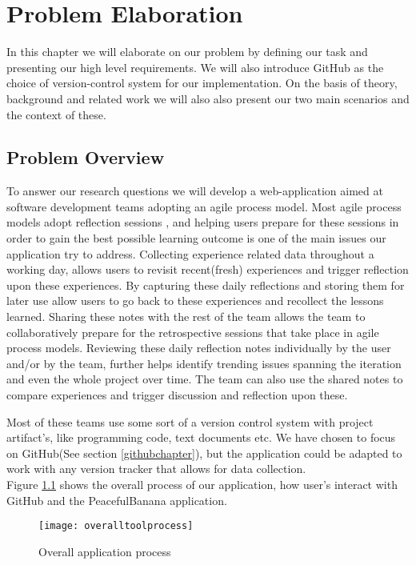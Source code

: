 \chapter{Problem Elaboration}
\label{chap:problemelaboration}
\label{problemelaboration}
In this chapter we will elaborate on our problem by defining our task and presenting our high level requirements. We will also introduce GitHub as the choice of version-control system for our implementation.
On the basis of theory, background and related work we will also also present our two main scenarios and the context of these. 

\section{Problem Overview}
\label{problemdefinition}

To answer our research questions we will develop a web-application aimed at software development teams adopting an agile process model. Most agile process models adopt reflection sessions \citep{retrospectivedzone}, and helping users prepare for these sessions in order to gain the best possible learning outcome is one of the main issues our application try to address. Collecting experience related data throughout a working day, allows users to revisit recent(fresh) experiences and trigger reflection upon these experiences. By capturing these daily reflections and storing them for later use allow users to go back to these experiences and recollect the lessons learned. Sharing these notes with the rest of the team allows the team to collaboratively prepare for the retrospective sessions that take place in agile process models. Reviewing these daily reflection notes individually by the user and/or by the team, further helps identify trending issues spanning the iteration and even the whole project over time. The team can also use the shared notes to compare experiences and trigger discussion and reflection upon these. 

Most of these teams use some sort of a version control system with project artifact's, like programming code, text documents etc. We have chosen to focus on GitHub(See section \ref{githubchapter}), but the application could be adapted to work with any version tracker that allows for data collection. \\
Figure \ref{overalltoolprocess} shows the overall process of our application, how user's interact with GitHub and the PeacefulBanana application. 
\begin{figure}[H]
\centering
	\texttt{[image: overalltoolprocess]}
\caption{Overall application process}
\label{overalltoolprocess}
\end{figure}

